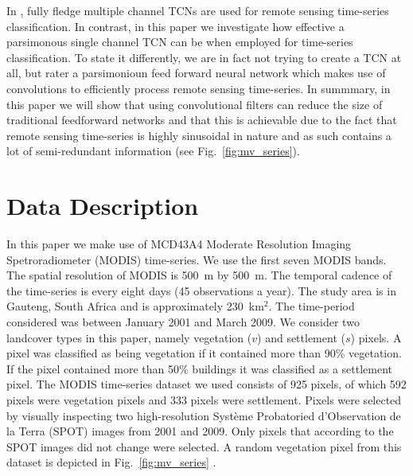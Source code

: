 \documentclass{article}
\begin{document}
In \cite{zhong2019}, fully fledge multiple channel TCNs are used for remote sensing time-series classification. In contrast, in this paper we investigate how effective a parsimonous single channel TCN can be when employed for time-series classification. To state it differently, we are in fact not trying to create a TCN at all, but rater a parsimonioun feed forward neural network which makes use of convolutions to efficiently process remote sensing time-series. In summmary, in this paper we will show that using convolutional filters can reduce the size of traditional feedforward networks and that this is achievable due to the fact that remote sensing time-series is highly sinusoidal in nature and as such contains a lot of semi-redundant information (see Fig.~\ref{fig:mv_series}). %

\section{Data Description}
\label{sec:data}    
In this paper we make use of MCD43A4 Moderate Resolution Imaging Spetroradiometer (MODIS) time-series. We use the first seven MODIS bands. The spatial resolution of MODIS is 500~m by 500~m. The temporal cadence of the time-series is every eight days (45 observations a year). The study area is in Gauteng, South Africa and is approximately 230~km$^2$. The time-period considered was between January 2001 and March 2009. We consider two landcover types in this paper, namely vegetation ($v$) and settlement ($s$) pixels. A pixel was classified as being vegetation if it contained more than 90\% vegetation. If the pixel contained more than 50\% buildings it was classified as a settlement pixel. 
The MODIS time-series dataset we used consists of 925 pixels, of which 592 pixels were vegetation pixels and 333 pixels were settlement. Pixels were selected by visually inspecting two high-resolution Syst\`{e}me Probatoried d'Observation de la Terra (SPOT) images from 2001 and 2009. Only pixels that according to the SPOT images did not change were selected. A random vegetation pixel from this dataset is depicted in Fig.~\ref{fig:mv_series} \cite{ackermann2011,grobler2013,grobler2019}. 
\end{document}
